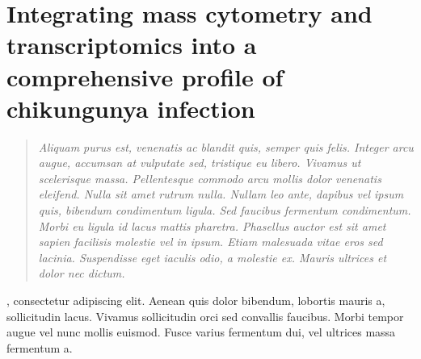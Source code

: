 
\chapter{Integrating mass cytometry and transcriptomics into a comprehensive profile of chikungunya infection}
\label{chap:chik}

\begin{quote}
\emph{Aliquam purus est, venenatis ac blandit quis, semper quis felis. Integer arcu augue, accumsan at vulputate sed, tristique eu libero. Vivamus ut scelerisque massa. Pellentesque commodo arcu mollis dolor venenatis eleifend. Nulla sit amet rutrum nulla. Nullam leo ante, dapibus vel ipsum quis, bibendum condimentum ligula. Sed faucibus fermentum condimentum. Morbi eu ligula id lacus mattis pharetra. Phasellus auctor est sit amet sapien facilisis molestie vel in ipsum. Etiam malesuada vitae eros sed lacinia. Suspendisse eget iaculis odio, a molestie ex. Mauris ultrices et dolor nec dictum.}
\end{quote}

, consectetur adipiscing elit. Aenean quis dolor bibendum, lobortis mauris a, sollicitudin lacus. Vivamus sollicitudin orci sed convallis faucibus. Morbi tempor augue vel nunc mollis euismod. Fusce varius fermentum dui, vel ultrices massa fermentum a. 
